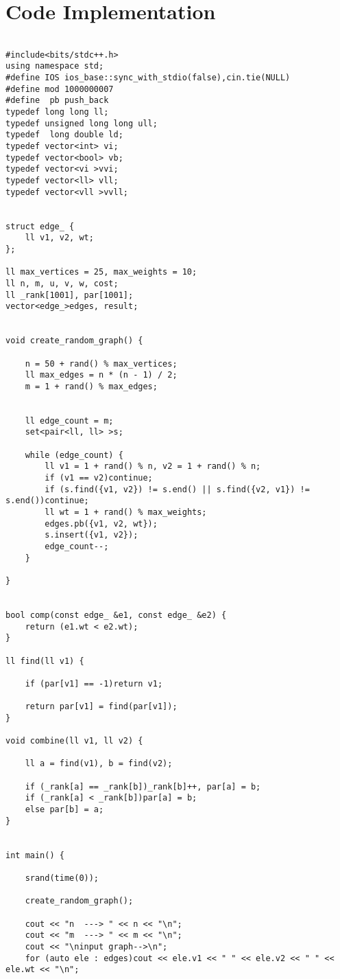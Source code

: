 \documentclass[10pt]{article}
\begin{document}
\section*{Code Implementation}
\begin{lstlisting}

#include<bits/stdc++.h>
using namespace std;
#define IOS ios_base::sync_with_stdio(false),cin.tie(NULL)
#define mod 1000000007
#define  pb push_back
typedef long long ll;
typedef unsigned long long ull;
typedef  long double ld;
typedef vector<int> vi;
typedef vector<bool> vb;
typedef vector<vi >vvi;
typedef vector<ll> vll;
typedef vector<vll >vvll;


struct edge_ {
	ll v1, v2, wt;
};

ll max_vertices = 25, max_weights = 10;
ll n, m, u, v, w, cost;
ll _rank[1001], par[1001];
vector<edge_>edges, result;


void create_random_graph() {

	n = 50 + rand() % max_vertices;
	ll max_edges = n * (n - 1) / 2;
	m = 1 + rand() % max_edges;


	ll edge_count = m;
	set<pair<ll, ll> >s;

	while (edge_count) {
		ll v1 = 1 + rand() % n, v2 = 1 + rand() % n;
		if (v1 == v2)continue;
		if (s.find({v1, v2}) != s.end() || s.find({v2, v1}) != s.end())continue;
		ll wt = 1 + rand() % max_weights;
		edges.pb({v1, v2, wt});
		s.insert({v1, v2});
		edge_count--;
	}

}


bool comp(const edge_ &e1, const edge_ &e2) {
	return (e1.wt < e2.wt);
}

ll find(ll v1) {

	if (par[v1] == -1)return v1;

	return par[v1] = find(par[v1]);
}

void combine(ll v1, ll v2) {

	ll a = find(v1), b = find(v2);

	if (_rank[a] == _rank[b])_rank[b]++, par[a] = b;
	if (_rank[a] < _rank[b])par[a] = b;
	else par[b] = a;
}


int main() {

	srand(time(0));

	create_random_graph();

	cout << "n  ---> " << n << "\n";
	cout << "m  ---> " << m << "\n";
	cout << "\ninput graph-->\n";
	for (auto ele : edges)cout << ele.v1 << " " << ele.v2 << " " << ele.wt << "\n";



\end{lstlisting}
\end{document}
